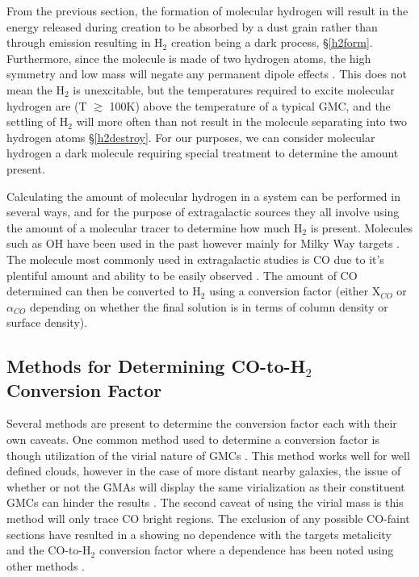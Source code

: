 From the previous section, the formation of molecular hydrogen will result in the energy released during creation to be absorbed by a dust grain rather than through emission resulting in H$_2$ creation being a dark process, \S \ref{h2form}.  Furthermore, since the molecule is made of two hydrogen atoms, the high symmetry and low mass will negate any permanent dipole effects \citep{bolatto2013,kennicutt2012}.  This does not mean the H$_2$ is unexcitable, but the temperatures required to excite molecular hydrogen are (T $\gtrsim$ 100K)  above the temperature of a typical GMC\citep{bolatto2013}, and the settling of H$_2$ will more often than not result in the molecule separating into two hydrogen atoms \S \ref{h2destroy}.  For our purposes, we can consider molecular hydrogen a dark molecule requiring special treatment to determine the amount present.

Calculating the amount of molecular hydrogen in a system can be performed in several ways, and for the purpose of extragalactic sources they all involve using the amount of a molecular tracer to determine how much H$_2$ is present.  Molecules such as OH have been used in the past however mainly for Milky Way targets \citep{barrett1964}.  The molecule most commonly used in extragalactic studies is CO due to it's plentiful amount and ability to be easily observed \citep{bolatto2013}.  The amount of CO determined can then be converted to H$_2$ using a conversion factor (either X$_{CO}$ or $\alpha_{CO}$ depending on whether the final solution is in terms of column density or surface density).


\subsection{Methods for Determining CO-to-H$_2$ Conversion Factor}

Several methods are present to determine the conversion factor each with their own caveats.  One common method used to determine a conversion factor is though utilization of the virial nature of GMCs \citep{bolatto2013}.  This method works well for well defined clouds, however in the case of more distant nearby galaxies, the issue of whether or not the GMAs will display the same virialization as their constituent GMCs can hinder the results \citep{bolatto2013}.  The second caveat of using the virial mass is this method will only trace CO bright regions.  The exclusion of any possible CO-faint sections have resulted in a showing no dependence with the targets metalicity and the CO-to-H$_2$ conversion factor where a dependence has been noted using other methods \citep{bolatto2013}.  %

